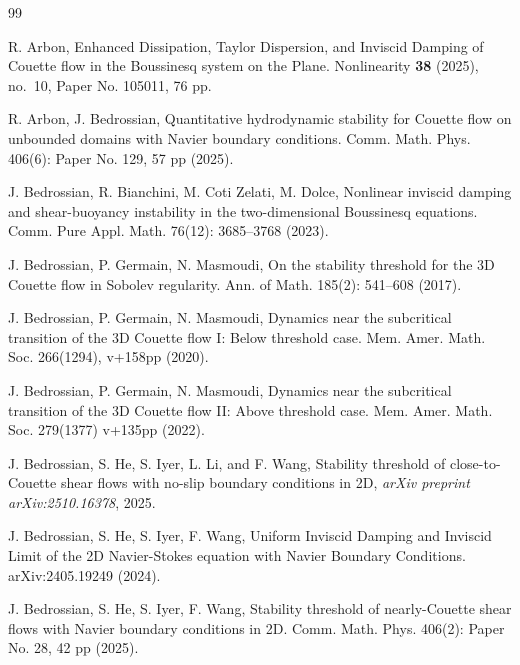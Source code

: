\documentclass[12pt]{article}
\numberwithin{equation}{section}
\begin{document}
    	\begin{thebibliography}{99}
  		
		R. Arbon, Enhanced Dissipation, Taylor Dispersion, and Inviscid Damping of Couette flow in the Boussinesq system on the Plane. Nonlinearity {\bf 38} (2025), no.~10, Paper No. 105011, 76 pp.
		
		R. Arbon, J. Bedrossian, Quantitative hydrodynamic stability for Couette flow on unbounded domains with Navier boundary conditions. Comm. Math. Phys. 406(6): Paper No. 129, 57 pp (2025).
		
		J. Bedrossian, R. Bianchini, M. Coti Zelati, M. Dolce, Nonlinear inviscid damping and shear-buoyancy instability in the two-dimensional Boussinesq equations. Comm. Pure Appl. Math. 76(12): 3685–3768 (2023).
  		
  		
  		J. Bedrossian, P. Germain, N. Masmoudi, On the stability threshold for the 3D Couette flow in
  		Sobolev regularity. Ann. of Math.  185(2): 541--608 (2017).
  		
  		J. Bedrossian, P. Germain, N. Masmoudi, Dynamics near the subcritical transition of the 3D Couette flow I: Below threshold case. Mem. Amer. Math. Soc. 266(1294), v+158pp (2020).
  		
  		J. Bedrossian, P. Germain, N. Masmoudi, Dynamics near the subcritical transition of the 3D Couette flow II: Above threshold case. Mem. Amer. Math. Soc. 279(1377) v+135pp (2022).
  		
  		  J. Bedrossian, S. He, S. Iyer, L. Li, and F. Wang, Stability threshold of close-to-Couette shear flows with no-slip boundary conditions in 2D,
  		\textit{arXiv preprint arXiv:2510.16378}, 2025.
  		
  		J. Bedrossian, S. He, S. Iyer, F. Wang, Uniform Inviscid Damping and Inviscid Limit of the 2D Navier-Stokes equation with Navier Boundary Conditions. arXiv:2405.19249  (2024).
  		
  		J. Bedrossian, S. He, S. Iyer, F. Wang, Stability threshold of nearly-Couette shear flows with Navier boundary conditions in 2D.  Comm. Math. Phys. 406(2): Paper No. 28, 42 pp (2025).
 

\end{thebibliography}
\end{document}
